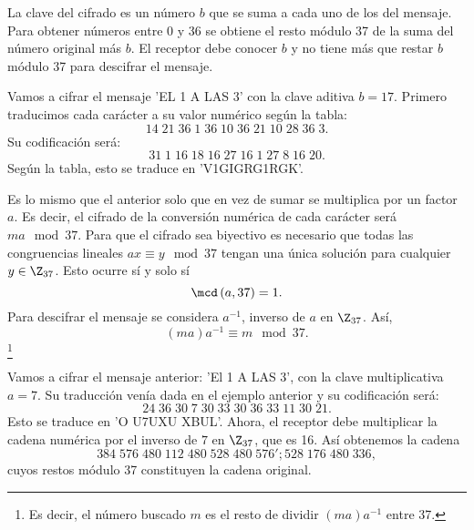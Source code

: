 \begin{fdefinition}
\normalfont La clave del cifrado es un número $\displaystyle b $ que se suma a cada uno de los del mensaje. Para obtener números entre 0 y 36 se obtiene el resto módulo 37 de la suma del número original más $\displaystyle b $. El receptor debe conocer $\displaystyle b $ y no tiene más que restar $\displaystyle b $ módulo 37 para descifrar el mensaje.
\end{fdefinition}

\begin{eg}
\normalfont Vamos a cifrar el mensaje 'EL 1 A LAS 3' con la clave aditiva $\displaystyle b = 17 $. Primero traducimos cada carácter a su valor numérico según la tabla:
\[14 \; 21 \; 36 \; 1 \; 36 \; 10 \; 36 \; 21 \; 10 \; 28 \; 36 \; 3 .\]
Su codificación será:
\[31 \; 1 \; 16 \; 18 \; 16 \; 27 \; 16 \; 1 \; 27 \; 8 \; 16 \; 20 .\]
Según la tabla, esto se traduce en 'V1GIGRG1RGK'.
\end{eg}

\begin{fdefinition}
\normalfont Es lo mismo que el anterior solo que en vez de sumar se multiplica por un factor $\displaystyle a $. Es decir, el cifrado de la conversión numérica de cada carácter será $\displaystyle ma \mod 37 $. Para que el cifrado sea biyectivo es necesario que todas las congruencias lineales $\displaystyle ax \equiv y \mod 37 $ tengan una única solución para cualquier $\displaystyle y \in \Z_{37} $. Esto ocurre sí y solo sí 
\[\mcd\left(a, 37\right) = 1 .\]
Para descifrar el mensaje se considera $\displaystyle a^{-1} $, inverso de $\displaystyle a $ en $\displaystyle \Z_{37} $. Así, 
\[\left(ma\right)a^{-1} \equiv m \mod37 .\]
\footnote{Es decir, el número buscado $\displaystyle m $ es el resto de dividir $\displaystyle \left(ma\right)a^{-1} $ entre 37.} 
\end{fdefinition}

\begin{eg}
\normalfont Vamos a cifrar el mensaje anterior: 'El 1 A LAS 3', con la clave multiplicativa $\displaystyle a = 7 $. Su traducción venía dada en el ejemplo anterior y su codificación será:
\[24 \; 36 \; 30 \; 7 \; 30 \; 33 \; 30 \; 36 \; 33 \; 11 \; 30 \; 21 .\]
Esto se traduce en 'O U7UXU XBUL'. Ahora, el receptor debe multiplicar la cadena numérica por el inverso de $\displaystyle 7 $ en $\displaystyle \Z_{37} $, que es 16. Así obtenemos la cadena 
\[384 \; 576 \; 480 \; 112 \; 480 \; 528 \; 480 \; 576 '; 528 \; 176 \; 480 \; 336 ,\]
cuyos restos módulo 37 constituyen la cadena original.
\end{eg}


